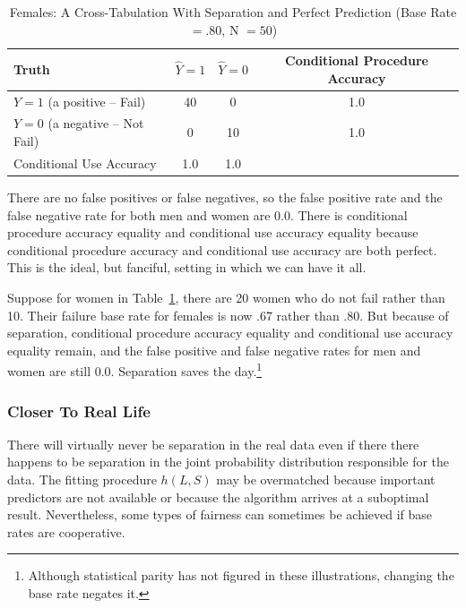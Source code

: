 \documentclass[12pt]{article}
\begin{document}
\begin{table}[htbp]
\footnotesize
\caption{Females: A Cross-Tabulation With Separation and Perfect Prediction (Base Rate $=.80$, N $=50$)}
\begin{center}
\begin{tabular}{|l|c|c|c|}
\hline \hline
Truth & $\hat{Y} = 1$ & $\hat{Y} = 0$ & Conditional Procedure Accuracy  \\
\hline
$ Y=1$ (a positive -- Fail) & 40 & 0  & 1.0 \\
\hline
$Y = 0$  (a negative -- Not Fail)& 0 & 10  & 1.0 \\
\hline
Conditional Use Accuracy & 1.0 & 1.0 & \\
\hline
\hline
\end{tabular}
\end{center}
\label{tab:NoErrorF}
\end{table}

There are no false positives or false negatives, so the false positive rate and the false negative rate for both men and women are 0.0. There is conditional procedure accuracy equality and conditional use accuracy equality because conditional procedure accuracy and conditional use accuracy are both perfect. This is the ideal, but fanciful, setting in which we can have it all. 

Suppose for women in Table~\ref{tab:NoErrorF}, there are 20 women who do not fail rather than 10. Their failure base rate for females is now .67 rather than .80. But because of separation, conditional procedure accuracy equality and conditional use accuracy equality remain, and the false positive and false negative rates for men and women are still 0.0. Separation saves the day.\footnote
{
Although statistical parity has not figured in these illustrations, changing the base rate negates it. 
 }
 
\subsubsection{Closer To Real Life}

There will virtually never be separation in the real data even if there there happens to be separation in the joint probability distribution responsible for the data. The fitting procedure $h(L,S)$ may be overmatched because important predictors are not available or because the algorithm arrives at a suboptimal result.  Nevertheless, some types of fairness can sometimes be achieved if base rates are cooperative. 
\end{document}
